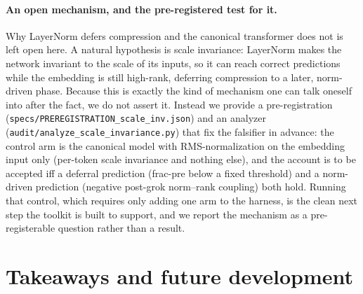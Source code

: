\documentclass[11pt]{article}
\begin{document}
\paragraph{An open mechanism, and the pre-registered test for it.} Why LayerNorm defers compression and
the canonical transformer does not is left open here. A natural hypothesis is scale invariance: LayerNorm
makes the network invariant to the scale of its inputs, so it can reach correct predictions while the
embedding is still high-rank, deferring compression to a later, norm-driven phase. Because this is exactly
the kind of mechanism one can talk oneself into after the fact, we do not assert it. Instead we
provide a pre-registration (\texttt{specs/PREREGISTRATION\_scale\_inv.json}) and an analyzer
(\texttt{audit/analyze\_scale\_invariance.py}) that fix the falsifier in advance: the control arm is the
canonical model with RMS-normalization on the embedding input only (per-token scale invariance and nothing
else), and the account is to be accepted iff a deferral prediction (frac-pre below a fixed threshold) and a
norm-driven prediction (negative post-grok norm--rank coupling) both hold. Running that control, which
requires only adding one arm to the harness, is the clean next step the toolkit is built to support, and we
report the mechanism as a pre-registerable question rather than a result.

\section{Takeaways and future development}
\end{document}

